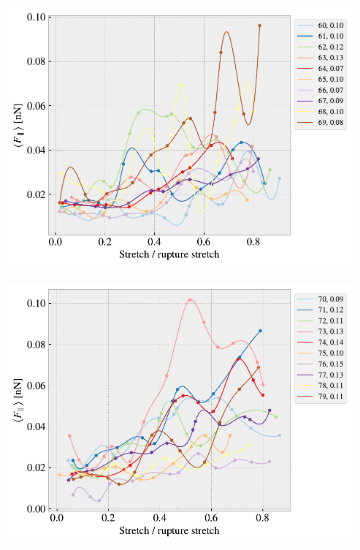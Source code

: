 \begin{figure}[H]
    \centering
    \begin{subfigure}[b]{0.49\textwidth}
        \centering
        \includegraphics[width=\textwidth]{figures/stretch_profiles/RW/SP_6_RW.pdf}
        \caption{}
        \label{fig:}
    \end{subfigure}
    \hfill
    \begin{subfigure}[b]{0.49\textwidth}
        \centering
        \includegraphics[width=\textwidth]{figures/stretch_profiles/RW/SP_7_RW.pdf}
        \caption{}
        \label{fig:}
    \end{subfigure}
    \hfill
    \begin{subfigure}[b]{0.49\textwidth}

\end{subfigure}
\end{figure}
